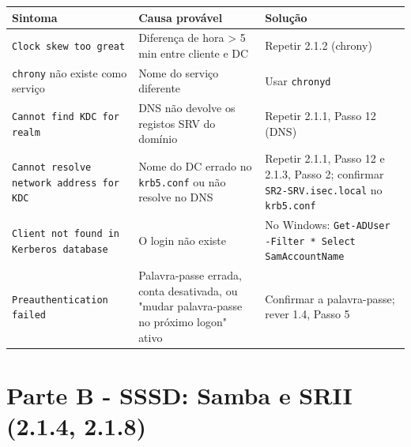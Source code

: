 \documentclass[11pt,a4paper,oneside]{report}
\begin{document}
\begin{center}\small
\begin{tabularx}{\linewidth}{|>{\raggedright\arraybackslash}X|>{\raggedright\arraybackslash}X|>{\raggedright\arraybackslash}X|}
\hline
\rowcolor{azul!10}\textbf{Sintoma} & \textbf{Causa provável} & \textbf{Solução} \\
\hline
\texttt{Clock skew too great} & Diferença de hora \textgreater{} 5 min entre cliente e DC & Repetir 2.1.2 (chrony) \\
\hline
\texttt{chrony} não existe como serviço & Nome do serviço diferente & Usar \texttt{chronyd} \\
\hline
\texttt{Cannot find KDC for realm} & DNS não devolve os registos SRV do domínio & Repetir 2.1.1, Passo 12 (DNS) \\
\hline
\texttt{Cannot resolve network address for KDC} & Nome do DC errado no \texttt{krb5.conf} ou não resolve no DNS & Repetir 2.1.1, Passo 12 e 2.1.3, Passo 2; confirmar \texttt{SR2-SRV.isec.local} no \texttt{krb5.conf} \\
\hline
\texttt{Client not found in Kerberos database} & O login não existe & No Windows: \texttt{Get-ADUser -Filter * \textbar{} Select SamAccountName} \\
\hline
\texttt{Preauthentication failed} & Palavra-passe errada, conta desativada, ou "mudar palavra-passe no próximo logon" ativo & Confirmar a palavra-passe; rever 1.4, Passo 5 \\
\hline
\end{tabularx}
\end{center}

\label{ec-b1-samba}

\section*{Parte B - SSSD: Samba e SRII (2.1.4, 2.1.8)}
\end{document}
